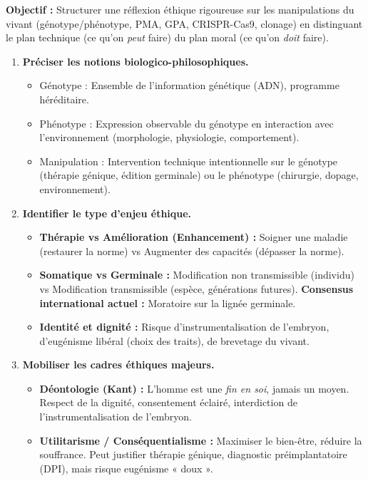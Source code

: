 \documentclass[11pt]{article}
\newcommand{\cle}[1]{{\popxbold\color{popdark}#1}}
\begin{document}
\begin{methode}
    \textbf{Objectif :} Structurer une réflexion éthique rigoureuse sur les manipulations du vivant (génotype/phénotype, PMA, GPA, CRISPR-Cas9, clonage) en distinguant le plan technique (ce qu'on \emph{peut} faire) du plan moral (ce qu'on \emph{doit} faire).
    \begin{enumerate}
        \item \textbf{Préciser les notions biologico-philosophiques.}
        \begin{itemize}
            \item \cle{Génotype} : Ensemble de l'information génétique (ADN), programme héréditaire.
            \item \cle{Phénotype} : Expression observable du génotype en interaction avec l'environnement (morphologie, physiologie, comportement).
            \item \cle{Manipulation} : Intervention technique intentionnelle sur le génotype (thérapie génique, édition germinale) ou le phénotype (chirurgie, dopage, environnement).
        \end{itemize}
        \item \textbf{Identifier le type d'enjeu éthique.}
        \begin{itemize}
            \item \textbf{Thérapie vs Amélioration (Enhancement) :} Soigner une maladie (restaurer la norme) vs Augmenter des capacités (dépasser la norme).
            \item \textbf{Somatique vs Germinale :} Modification non transmissible (individu) vs Modification transmissible (espèce, générations futures). \textbf{Consensus international actuel :} Moratoire sur la lignée germinale.
            \item \textbf{Identité et dignité :} Risque d'instrumentalisation de l'embryon, d'eugénisme libéral (choix des traits), de brevetage du vivant.
        \end{itemize}
        \item \textbf{Mobiliser les cadres éthiques majeurs.}
        \begin{itemize}
            \item \textbf{Déontologie (Kant) :} L'homme est une \emph{fin en soi}, jamais un moyen. Respect de la dignité, consentement éclairé, interdiction de l'instrumentalisation de l'embryon.
            \item \textbf{Utilitarisme / Conséquentialisme :} Maximiser le bien-être, réduire la souffrance. Peut justifier thérapie génique, diagnostic préimplantatoire (DPI), mais risque eugénisme « doux ».

\end{itemize}
\end{enumerate}
\end{methode}
\end{document}
